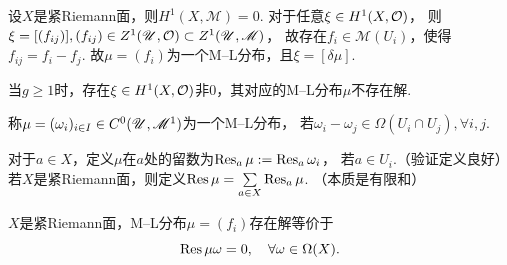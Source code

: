\begin{remark}
	设$X$是紧Riemann面，则$H^1(X,\mathscr{M})=0$. 对于任意$\xi\in H^1(X,\mathcal{O})$，
    则$\xi=[(f_{ij})], (f_{ij})\in Z^1(\mathscr{U}, \mathcal{O})\subset Z^1(\mathscr{U}, \mathscr{M})$，
    故存在$f_i\in \mathscr{M}(U_i)$，使得$f_{ij}=f_i-f_j$. 
    故$\mu=(f_i)$为一个M--L分布，且$\xi=[\delta \mu]$.

	当$g\geq 1$时，存在$\xi\in H^1(X, \mathcal{O})$非$0$，其对应的M--L分布$\mu$不存在解.
\end{remark}

\begin{definition}
	称$\mu=(\omega_i)_{i \in I}\in C^0(\mathscr{U}, \mathscr{M}^1)$为一个M--L分布，
    若$\omega_i-\omega_j \in \Omega(U_i\cap U_j), \forall i,j$.

	对于$a\in X$，定义$\mu$在$a$处的留数为$\operatorname{Res}_a \mu :=\operatorname{Res}_a \omega_i$，
    若$a\in U_i$.（验证定义良好）
	若$X$是紧Riemann面，则定义$\operatorname{Res} \mu =\sum\limits_{a\in X} \operatorname{Res}_a \mu$.
    （本质是有限和）
\end{definition}

\begin{theorem}
	$X$是紧Riemann面，M--L分布$\mu=(f_i)$存在解等价于
	$$\operatorname{Res} \mu \omega=0, \quad \forall \omega \in \Omega(X).$$
\end{theorem}

